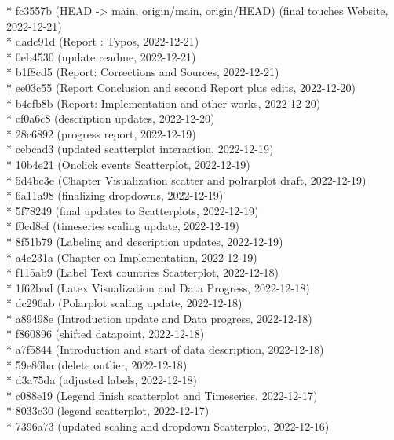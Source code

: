 \documentclass[usegeometry=true]{scrartcl}
\begin{document}
* fc3557b (HEAD -> main, origin/main, origin/HEAD) (final touches Website, 2022-12-21)\\
* dadc91d (Report : Typos, 2022-12-21)\\
* 0eb4530 (update readme, 2022-12-21)\\
* b1f8cd5 (Report: Corrections and Sources, 2022-12-21) \\
* ee03c55 (Report Conclusion and second Report plus edits, 2022-12-20) \\
* b4efb8b (Report: Implementation and other works, 2022-12-20) \\
* cf0a6c8 (description updates, 2022-12-20)\\
* 28c6892 (progress report, 2022-12-19)\\
* cebcad3 (updated scatterplot interaction, 2022-12-19)\\
* 10b4e21 (Onclick events Scatterplot, 2022-12-19)\\
* 5d4bc3e (Chapter Visualization scatter and polrarplot draft, 2022-12-19)\\
* 6a11a98 (finalizing dropdowns, 2022-12-19)\\
* 5f78249 (final updates to Scatterplots, 2022-12-19)\\
* f0cd8ef (timeseries scaling update, 2022-12-19)\\
* 8f51b79 (Labeling and description updates, 2022-12-19)\\
* a4c231a (Chapter on Implementation, 2022-12-19)\\
* f115ab9 (Label Text countries Scatterplot, 2022-12-18)\\
* 1f62bad (Latex Visualization and Data Progress, 2022-12-18)\\
* dc296ab (Polarplot scaling update, 2022-12-18)\\
* a89498e (Introduction update and Data progress, 2022-12-18)\\
* f860896 (shifted datapoint, 2022-12-18)\\
* a7f5844 (Introduction and start of data description, 2022-12-18)\\
* 59e86ba (delete outlier, 2022-12-18)\\
* d3a75da (adjusted labels, 2022-12-18)\\
* c088e19 (Legend finish scatterplot and Timeseries, 2022-12-17)\\
* 8033c30 (legend scatterplot, 2022-12-17)\\
* 7396a73 (updated scaling and dropdown Scatterplot, 2022-12-16)\\
\end{document}
